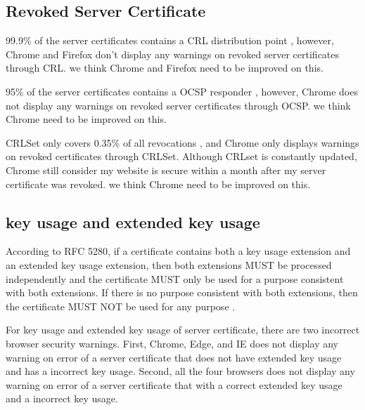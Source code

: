 

\subsection{Revoked Server Certificate}
    99.9\% of the server certificates contains a CRL distribution point \cite{liu2015end},
        however, Chrome and Firefox don't display any warnings on revoked server certificates through CRL.
        we think Chrome and Firefox need to be improved on this.

    95\% of the server certificates contains a OCSP responder \cite{liu2015end},
        however, Chrome does not display any warnings on revoked server certificates through OCSP.
        we think Chrome need to be improved on this.

    CRLSet only covers 0.35\% of all revocations \cite{liu2015end},
        and Chrome only displays warnings on revoked certificates through CRLSet.
        Although CRLset is constantly updated, Chrome still consider my website is secure within a month after my server certificate was revoked.
        we think Chrome need to be improved on this.

\subsection{key usage and extended key usage}

According to RFC 5280, if a certificate contains both a key usage extension and an extended key usage extension,
    then both extensions MUST be processed independently
    and the certificate MUST only be used for a purpose consistent with both extensions.
    If there is no purpose consistent with both extensions, then the certificate MUST NOT be used for any purpose \cite{cooper2008rfc5280}.

For key usage and extended key usage of server certificate, there are two incorrect browser security warnings.
    First, Chrome, Edge, and IE does not display any warning on error of a server certificate that does not have extended key usage and has a incorrect key usage.
    Second, all the four browsers does not display any warning on error of a server certificate that with a correct extended key usage and a incorrect key usage.


